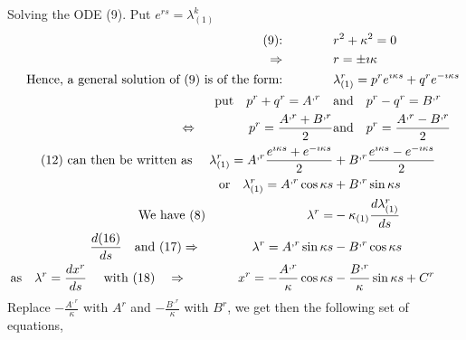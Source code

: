 Solving the ODE (9). Put $ e^{rs} = \lambda_{(1)}^k$
\begin{align}
\text{(9):}\quad\quad\quad\quad&  r^2 + \kappa^2 = 0\\
\Rightarrow \quad\quad\quad\quad & r = \pm \imath \kappa\\
\text{Hence, a general solution of (9) is of the form:} \quad\quad\quad\quad & \lambda_{(1)}^r = p^r e^{ \imath \kappa s}  + q^r e^{ -\imath \kappa s}\\
\text{put}\quad  p^r+q^r = A^{,r}\quad &\text{and}\quad p^r-q^r = B^{,r}\\
\Leftrightarrow \quad\quad\quad\quad p^r = \frac{A^{,r}+B^{,r}}{2} &\text{and}\quad p^r=\frac{A^{,r}-B^{,r}}{2}\\
\text{(12) can then be written as }\quad  \lambda_{(1)}^r = A^{,r}\frac{ e^{ \imath \kappa s}+  e^{ -\imath \kappa s}}{2} & + B^{,r}\frac{ e^{ \imath \kappa s}- e^{ -\imath \kappa s}}{2}\\
\text{or}\quad  \lambda_{(1)}^r = A^{,r}\cos \kappa s & + B^{,r}\sin \kappa s\\
\text{We have (8)}\quad\quad\quad\quad \quad\quad\quad\quad  \lambda^r =  & -  \kappa_{(1)} \dv{\lambda_{(1)}^r}{ s} \\
\dv{(16)}{s}\quad\text{and (17)}\Rightarrow\quad\quad\quad\quad \lambda^r =  A^{,r}\sin \kappa s & - B^{,r}\cos \kappa s\\
\text{as}\quad \lambda^r = \dv{x^r}{s}\quad\text{ with (18)}\quad \Rightarrow \quad\quad\quad\quad x^r = - \frac{A^{,r}}{\kappa}\cos \kappa s &  - \frac{B^{,r}}{\kappa}\sin \kappa s + C^r\\
\end{align}
Replace $- \frac{A^{,r}}{\kappa}$ with $A^{r}$ and $- \frac{B^{,r}}{\kappa}$ with $B^{r}$, we get then the following set of equations,

